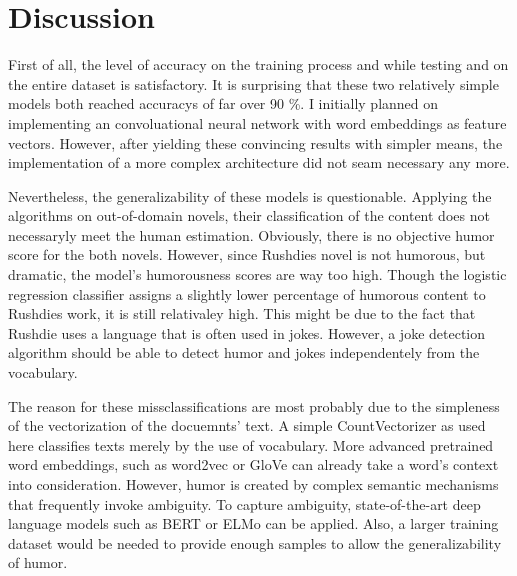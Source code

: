 \documentclass[12pt]{scrartcl}
\begin{document}
\section{Discussion}
First of all, the level of accuracy on the training process and while testing and on the entire dataset is satisfactory.
It is surprising that these two relatively simple models both reached accuracys of far over 90 \%.
I initially planned on implementing an convoluational neural network with word embeddings as feature vectors.
However, after yielding these convincing results with simpler means, the implementation of a more complex architecture did not seam necessary any more.

Nevertheless, the generalizability of these models is questionable.
Applying the algorithms on out-of-domain novels, their classification of the content does not necessaryly meet the human estimation.
Obviously, there is no objective humor score for the both novels. 
However, since Rushdies novel is not humorous, but dramatic, the model's humorousness scores are way too high.
Though the logistic regression classifier assigns a slightly lower percentage of humorous content to Rushdies work, it is still relativaley high.
This might be due to the fact that Rushdie uses a language that is often used in jokes.
However, a joke detection algorithm should be able to detect humor and jokes independentely from the vocabulary.


The reason for these missclassifications are most probably due to the simpleness of the vectorization of the docuemnts' text.
A simple CountVectorizer as used here classifies texts merely by the use of vocabulary.
More advanced pretrained word embeddings, such as word2vec or GloVe can already take a word's context into consideration.
However, humor is created by complex semantic mechanisms that frequently invoke ambiguity.
To capture ambiguity, state-of-the-art deep language models such as BERT or ELMo can be applied.
Also, a larger training dataset would be needed to provide enough samples to allow the generalizability of humor. 




\end{document}
